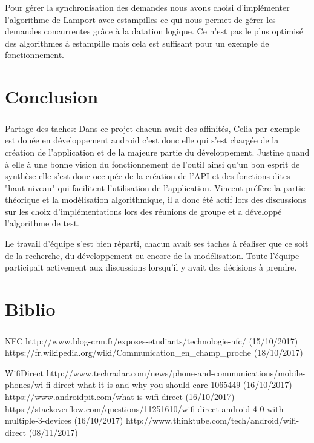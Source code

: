 \documentclass[a4paper,10pt]{report}
\begin{document}
Pour gérer la synchronisation des demandes nous avons choisi d'implémenter l'algorithme de Lamport avec estampilles ce qui nous permet de gérer les demandes concurrentes grâce à la datation logique. Ce n'est pas le plus optimisé des algorithmes à estampille mais cela est suffisant pour un exemple de fonctionnement.

\chapter{Conclusion}
\paragraph{}
Partage des taches:
Dans ce projet chacun avait des affinités, Celia par exemple est douée en développement android c'est donc elle qui s'est chargée de la création de l'application et de la majeure partie du développement. Justine quand à elle à une bonne vision du fonctionnement de l'outil ainsi qu'un bon esprit de synthèse elle s'est donc occupée de la création de l'API et des fonctions dites "haut niveau" qui facilitent l'utilisation de l'application. Vincent préfère la partie théorique et la modélisation algorithmique, il a donc été actif lors des discussions sur les choix d'implémentations lors des réunions de groupe et a développé l'algorithme de test.

Le travail d'équipe s'est bien réparti, chacun avait ses taches à réaliser que ce soit de la recherche, du développement ou encore de la modélisation. Toute l'équipe participait activement aux discussions lorsqu'il y avait des décisions à prendre.

\chapter*{Biblio}
 \paragraph{}
 NFC
 http://www.blog-crm.fr/exposes-etudiants/technologie-nfc/ (15/10/2017)
 https://fr.wikipedia.org/wiki/Communication_en_champ_proche (18/10/2017)
 
 WifiDirect
 http://www.techradar.com/news/phone-and-communications/mobile-phones/wi-fi-direct-what-it-is-and-why-you-should-care-1065449 (16/10/2017)
 https://www.androidpit.com/what-is-wifi-direct (16/10/2017)
 https://stackoverflow.com/questions/11251610/wifi-direct-android-4-0-with-multiple-3-devices (16/10/2017)
 http://www.thinktube.com/tech/android/wifi-direct (08/11/2017)
 
\end{document}
